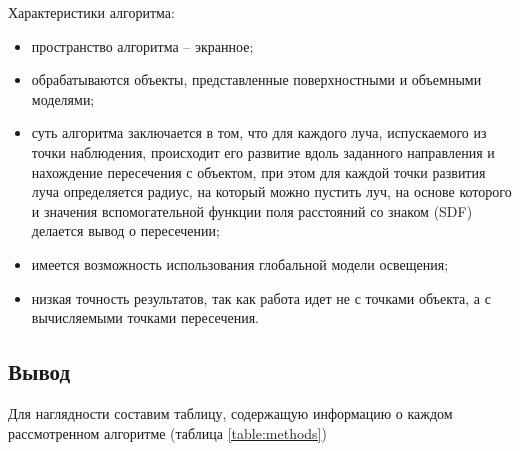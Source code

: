 Характеристики алгоритма:
\begin{itemize}
    \item пространство алгоритма -- экранное;
    \item обрабатываются объекты, представленные поверхностными и объемными моделями;
    \item суть алгоритма заключается в том, что для каждого луча, испускаемого из точки наблюдения, происходит его развитие вдоль заданного направления и нахождение пересечения с объектом, при этом для каждой точки развития луча определяется радиус, на который можно пустить луч, на основе которого и значения вспомогательной функции поля расстояний со знаком (SDF) делается вывод о пересечении;
    \item имеется возможность использования глобальной модели освещения;
    \item низкая точность результатов, так как работа идет не с точками объекта, а с вычисляемыми точками пересечения. \cite{raymarching}
\end{itemize}

\subsection{Вывод}

Для наглядности составим таблицу, содержащую информацию о каждом рассмотренном алгоритме (таблица \ref{table:methods})


